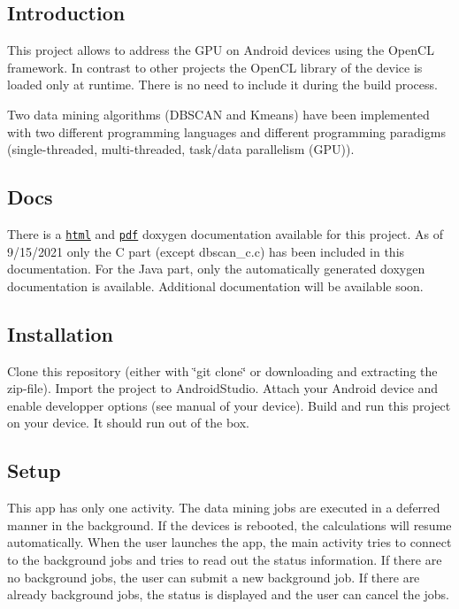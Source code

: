 \subsection*{Introduction}

This project allows to address the G\+PU on Android devices using the Open\+CL framework. In contrast to other projects the Open\+CL library of the device is loaded only at runtime. There is no need to include it during the build process.

Two data mining algorithms (D\+B\+S\+C\+AN and Kmeans) have been implemented with two different programming languages and different programming paradigms (single-\/threaded, multi-\/threaded, task/data parallelism (G\+PU)).

\subsection*{Docs}

There is a \href{app/doc/html/index.html}{\tt html} and \href{app/doc/latex/refman.pdf}{\tt pdf} doxygen documentation available for this project. As of 9/15/2021 only the C part (except dbscan\+\_\+c.\+c) has been included in this documentation. For the Java part, only the automatically generated doxygen documentation is available. Additional documentation will be available soon.

\subsection*{Installation}

Clone this repository (either with \char`\"{}git clone\char`\"{} or downloading and extracting the zip-\/file). Import the project to Android\+Studio. Attach your Android device and enable developper options (see manual of your device). Build and run this project on your device. It should run out of the box.

\subsection*{Setup}

This app has only one activity. The data mining jobs are executed in a deferred manner in the background. If the devices is rebooted, the calculations will resume automatically. When the user launches the app, the main activity tries to connect to the background jobs and tries to read out the status information. If there are no background jobs, the user can submit a new background job. If there are already background jobs, the status is displayed and the user can cancel the jobs.


